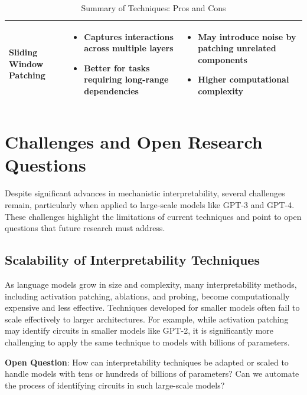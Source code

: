 \documentclass[sigconf,authoryear]{acmart}
\begin{document}
\begin{table}[h]
\begin{tabular}{|p{2.5cm}|p{2.5cm}|p{3cm}|}
  \hline
  \textbf{Sliding Window Patching} & 
    \begin{itemize}
      \item Captures interactions across multiple layers
      \item Better for tasks requiring long-range dependencies
    \end{itemize} &
    \begin{itemize}
      \item May introduce noise by patching unrelated components
      \item Higher computational complexity
    \end{itemize} \\
  \hline
  \end{tabular}
  \caption{Summary of Techniques: Pros and Cons}
  \label{tab:techniques}
  \end{table}
  




  \section{Challenges and Open Research Questions}

  Despite significant advances in mechanistic interpretability, several challenges remain, particularly when applied to large-scale models like GPT-3 and GPT-4. These challenges highlight the limitations of current techniques and point to open questions that future research must address.
  
  \subsection{Scalability of Interpretability Techniques}
  As language models grow in size and complexity, many interpretability methods, including activation patching, ablations, and probing, become computationally expensive and less effective. Techniques developed for smaller models often fail to scale effectively to larger architectures. For example, while activation patching may identify circuits in smaller models like GPT-2, it is significantly more challenging to apply the same technique to models with billions of parameters.
  
  \textbf{Open Question}: How can interpretability techniques be adapted or scaled to handle models with tens or hundreds of billions of parameters? Can we automate the process of identifying circuits in such large-scale models?
  
\end{document}
